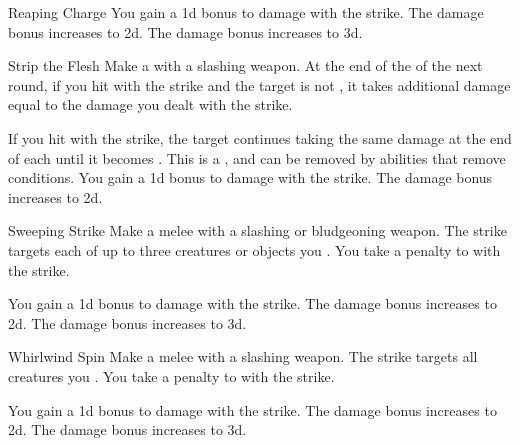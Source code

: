 {\begin{apability}{Reaping Charge}
                \rankline
                 You gain a \plus1d bonus to damage with the strike.
                 The damage bonus increases to \plus2d.
                 The damage bonus increases to \plus3d.
            \end{apability}

            \begin{apability}{Strip the Flesh}
                Make a  with a slashing weapon.
                At the end of the  of the next round, if you hit with the strike and the target is not , it takes additional damage equal to the damage you dealt with the strike.

                \rankline
                 If you hit with the strike, the target continues taking the same damage at the end of each  until it becomes .
                This is a , and can be removed by abilities that remove conditions.
                 You gain a \plus1d bonus to damage with the strike.
                 The damage bonus increases to \plus2d.
            \end{apability}

            \begin{apability}{Sweeping Strike}
                Make a melee  with a slashing or bludgeoning weapon.
                The strike targets each of up to three creatures or objects you .
                You take a  penalty to  with the strike.

                \rankline
                 You gain a \plus1d bonus to damage with the strike.
                 The damage bonus increases to \plus2d.
                 The damage bonus increases to \plus3d.
            \end{apability}

            \begin{apability}{Whirlwind Spin}
                Make a melee  with a slashing weapon.
                The strike targets all creatures you .
                You take a  penalty to  with the strike.

                \rankline
                 You gain a \plus1d bonus to damage with the strike.
                 The damage bonus increases to \plus2d.
                 The damage bonus increases to \plus3d.
            \end{apability}
        }

